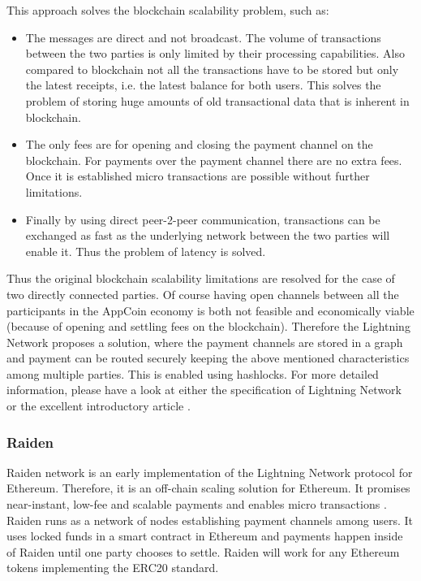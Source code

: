 This approach solves the blockchain scalability problem, such as:

\begin{itemize}
    \item The messages are direct and not broadcast. The volume of transactions between the two parties is only limited by their processing capabilities. Also compared to blockchain not all the transactions have to be stored but only the latest receipts, i.e. the latest balance for both users. This solves the problem of storing huge amounts of old transactional data that is inherent in blockchain.
    \item The only fees are for opening and closing the payment channel on the blockchain. For payments over the payment channel there are no extra fees. Once it is established micro transactions are possible without further limitations.
    \item Finally by using direct peer-2-peer communication, transactions can be exchanged as fast as the underlying network between the two parties will enable it. Thus the problem of latency is solved.
\end{itemize}

Thus the original blockchain scalability limitations are resolved for the case of two directly connected parties. Of course having open channels between all the participants in the AppCoin economy is both not feasible and economically viable (because of opening and settling fees on the blockchain). Therefore the Lightning Network proposes a solution, where the payment channels are stored in a graph and payment can be routed securely keeping the above mentioned characteristics among multiple parties. This is enabled using hashlocks. For more detailed information, please have a look at either the specification of Lightning Network or the excellent introductory article \cite{starkness}.



\subsubsection{Raiden}
Raiden network is an early implementation of the Lightning Network protocol for Ethereum. Therefore, it is an off-chain scaling solution for Ethereum. It promises near-instant, low-fee and scalable payments and enables micro transactions \cite{Raiden}. Raiden runs as a network of nodes establishing payment channels among users. It uses locked funds in a smart contract in Ethereum and payments happen inside of Raiden until one party chooses to settle. Raiden will work for any Ethereum tokens implementing the ERC20 standard.

